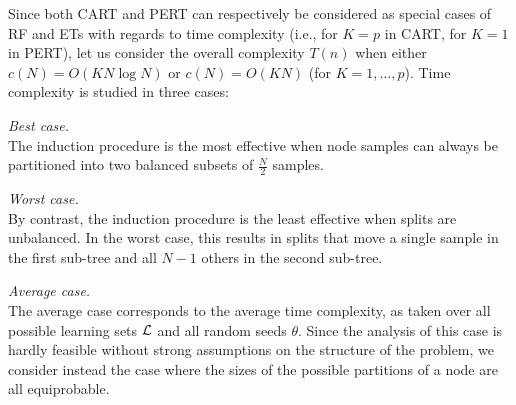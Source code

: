 Since both CART and PERT can respectively be considered as special cases of RF
and ETs with regards to time complexity (i.e., for $K=p$ in CART, for $K=1$ in
PERT), let us consider the overall complexity $T(n)$ when either
$c(N)=O(KN\log N)$ or $c(N)=O(KN)$ (for $K=1,\dots,p$). Time complexity
is studied in three cases:

\begin{description}
\item \textit{Best case.}\hfill\\
      The induction procedure is the most effective
      when node samples can always be partitioned into two balanced subsets of $\tfrac{N}{2}$
      samples.

\item \textit{Worst case.}\hfill\\
      By contrast, the induction procedure is the least
      effective when splits are unbalanced. In the worst case,
      this results in splits that move a single sample in the first sub-tree and
      all $N-1$ others in the second sub-tree.

\item \textit{Average case.}\hfill\\
      The average case corresponds to the average time
      complexity, as taken over all possible learning sets ${\cal L}$ and
      all random seeds $\theta$.  Since the analysis of this case is hardly
      feasible without strong assumptions on the structure of the problem,
      we consider instead the case where the sizes of the possible
      partitions of a node are all equiprobable.

\end{description}

